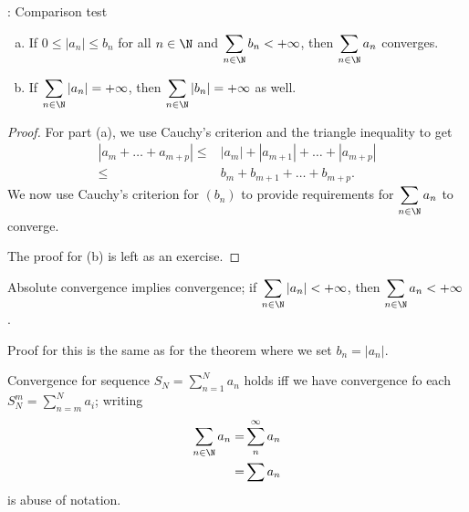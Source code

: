 \begin{ntheorem}{: Comparison test}
	\begin{enumerate}[(a)]
		\item If \(0\leq |a_n|\leq b_n\) for all \(n\in\N\) and \(\displaystyle\sum_{n\in\N}b_n<+\infty\), then \(\displaystyle\sum_{n\in\N}a_n\) converges.
		
		\item If \(\displaystyle\sum_{n\in\N}|a_n|=+\infty\), then \(\displaystyle\sum_{n\in\N}|b_n|=+\infty\) as well.
	\end{enumerate}
	\begin{comment}
		\begin{enumerate}[(a)]
			\item If \(0\leq |a_n|\leq b_n\) for all \(n\in\N\) and \(\displaystyle\sum_{n\in\N}b_n<+\infty\), then \(\displaystyle\sum_{n\in\N}a_n\) converges.
			
			\item If \(\displaystyle\sum_{n\in\N}|a_n|=+\infty\), then \(\displaystyle\sum_{n\in\N}|b_n|=+\infty\) as well.
		\end{enumerate}
	\end{comment}
\end{ntheorem}
\begin{proof}
	For part (a), we use Cauchy's criterion and the triangle inequality to get 
	\begin{align*}
		|a_m+\dots+a_{m+p}|\leq& |a_m|+|a_{m+1}|+\dots+|a_{m+p}|\\
		\leq&b_m+b_{m+1}+\dots+b_{m+p}.
	\end{align*}
	We now use Cauchy's criterion for \((b_n)\) to provide requirements for \(\displaystyle\sum_{n\in\N}a_n\) to converge.
	
	\medskip
	
	The proof for (b) is left as an exercise.
\end{proof}
\begin{corollary}
	Absolute convergence implies convergence; if \(\displaystyle\sum_{n\in\N}|a_n|<+\infty\), then \(\displaystyle\sum_{n\in\N}a_n<+\infty\).
\end{corollary}
Proof for this is the same as for the theorem where we set \(b_n=|a_n|\).
\begin{note}
	Convergence for sequence \(S_N=\displaystyle\sum_{n=1}^Na_n\) holds iff we have convergence fo each \(S_N^m=\displaystyle\sum_{n=m}^N a_i\); writing \begin{align*}
		\sum_{n\in\N}a_n=&\sum_n^\infty a_n\\
		=&\sum a_n
	\end{align*}
	is abuse of notation.
\end{note}

